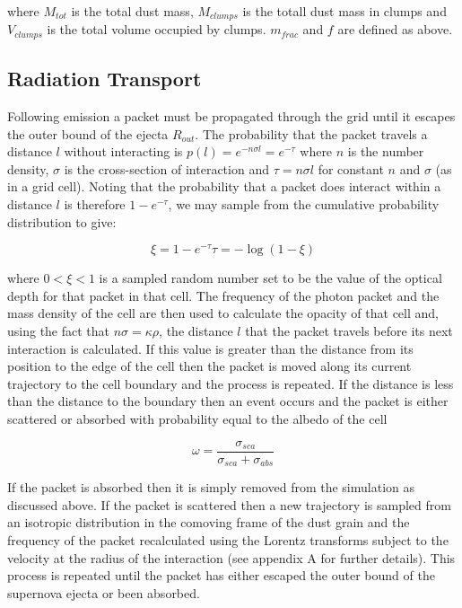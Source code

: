 \documentclass[useAMS,usenatbib]{mn2e}
\begin{document}
\noindent where $M_{tot}$ is the total dust mass, $M_{clumps}$ is the totall dust mass in clumps and $V_{clumps}$ is the total volume occupied by clumps.  $m_{frac}$ and $f$ are defined as above.

\subsection{Radiation Transport}
\label{transport}

Following emission a packet must be propagated through the grid until it escapes the outer bound of the ejecta $R_{out}$.  The probability that the packet travels a distance $l$ without interacting is 
$p(l)=e ^{-n \sigma l}=e ^{-\tau} $
where $n$ is the number density, $\sigma$ is the cross-section of interaction and $ \tau = n\sigma l$ for constant $n$ and $\sigma$ (as in a grid cell).  Noting that the probability that a packet does interact within a distance $l$ is therefore $1-e^{-\tau}$, we may sample from the cumulative probability distribution to give: 

\begin{equation}
\xi = 1 - e^{-\tau}   \tau=-\log (1-\xi)
\end{equation}

\noindent where $0<\xi<1$ is a sampled random number set to be the value of the optical depth for that packet in that cell.  The frequency of the photon packet and the mass density of the cell are then used to calculate the opacity of that cell and, using the fact that $n\sigma=\kappa\rho$, the distance $l$ that the packet travels before its next interaction is calculated.  If this value is greater than the distance from its position to the edge of the cell then the packet is moved along its current trajectory to the cell boundary and the process is repeated.  If the distance is less than the distance to the boundary then an event occurs and the packet is either scattered or absorbed with probability equal to the albedo of the cell

\begin{equation}
	\omega=\frac{\sigma_{sca}}{\sigma_{sca}+\sigma_{abs}}
\end{equation}

If the packet is absorbed then it is simply removed from the simulation as discussed above.  If the packet is scattered then a new trajectory is sampled from an isotropic distribution in the comoving frame of the dust grain and the frequency of the packet recalculated using the Lorentz transforms subject to the velocity at the radius of the interaction (see appendix A for further details).  This process is repeated until the packet has either escaped the outer bound of the supernova ejecta or been absorbed.
   
\end{document}
